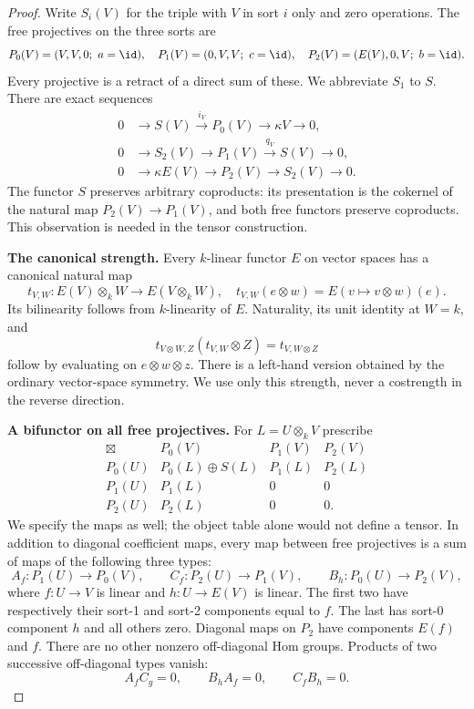 \begin{proof}
Write $S_i(V)$ for the triple with $V$ in sort $i$ only and zero operations. The free projectives on the three sorts are
\[
P_0(V)=(V,V,0;\ a=\id),\quad
P_1(V)=(0,V,V;\ c=\id),\quad
P_2(V)=(E(V),0,V;\ b=\id).
\]
Every projective is a retract of a direct sum of these. We abbreviate $S_1$ to $S$. There are exact sequences
\begin{align*}
0&\longrightarrow S(V)\xrightarrow{i_V}P_0(V)\longrightarrow\kappa V\longrightarrow0,\\
0&\longrightarrow S_2(V)\longrightarrow P_1(V)\xrightarrow{q_V}S(V)\longrightarrow0,\\
0&\longrightarrow\kappa E(V)\longrightarrow P_2(V)\longrightarrow S_2(V)\longrightarrow0.
\end{align*}
The functor $S$ preserves arbitrary coproducts: its presentation is the cokernel of the natural map $P_2(V)\to P_1(V)$, and both free functors preserve coproducts. This observation is needed in the tensor construction.

\textbf{The canonical strength.}
Every $k$-linear functor $E$ on vector spaces has a canonical natural map
\[
t_{V,W}:E(V)\otimes_k W\longrightarrow E(V\otimes_k W),
\quad t_{V,W}(e\otimes w)=E(v\mapsto v\otimes w)(e).
\]
Its bilinearity follows from $k$-linearity of $E$. Naturality, its unit identity at $W=k$, and
\[
t_{V\otimes W,Z}(t_{V,W}\otimes Z)=t_{V,W\otimes Z}
\]
follow by evaluating on $e\otimes w\otimes z$. There is a left-hand version obtained by the ordinary vector-space symmetry. We use only this strength, never a costrength in the reverse direction.

\textbf{A bifunctor on all free projectives.}
For $L=U\otimes_k V$ prescribe
\[
\begin{array}{c|ccc}
\boxtimes&P_0(V)&P_1(V)&P_2(V)\\ \hline
P_0(U)&P_0(L)\oplus S(L)&P_1(L)&P_2(L)\\
P_1(U)&P_1(L)&0&0\\
P_2(U)&P_2(L)&0&0.
\end{array}
\]
We specify the maps as well; the object table alone would not define a tensor. In addition to diagonal coefficient maps, every map between free projectives is a sum of maps of the following three types:
\[
A_f:P_1(U)\to P_0(V),\qquad
C_f:P_2(U)\to P_1(V),\qquad
B_h:P_0(U)\to P_2(V),
\]
where $f:U\to V$ is linear and $h:U\to E(V)$ is linear. The first two have respectively their sort-1 and sort-2 components equal to $f$. The last has sort-0 component $h$ and all others zero. Diagonal maps on $P_2$ have components $E(f)$ and $f$. There are no other nonzero off-diagonal Hom groups. Products of two successive off-diagonal types vanish:
\[
A_f C_g=0,\qquad B_h A_f=0,\qquad C_f B_h=0.
\]


\end{proof}
